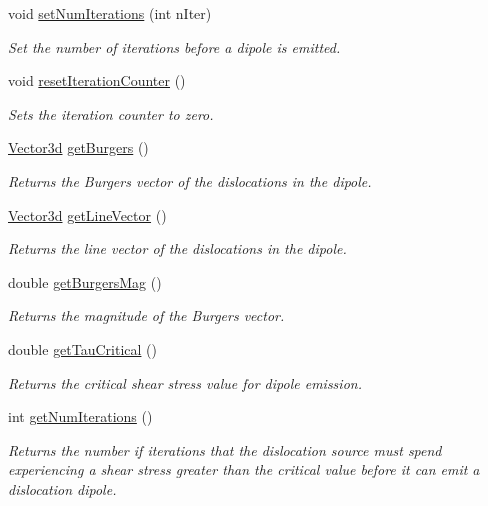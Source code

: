 \begin{DoxyCompactItemize}
void \hyperlink{classDislocationSource_a3042d73ee7ee346d825ab810dc5a6e83}{set\-Num\-Iterations} (int n\-Iter)
\begin{DoxyCompactList}\small\item\em Set the number of iterations before a dipole is emitted. \end{DoxyCompactList}\item 
void \hyperlink{classDislocationSource_a6dd6ad9fe448ce37152dfae4f3981ff0}{reset\-Iteration\-Counter} ()
\begin{DoxyCompactList}\small\item\em Sets the iteration counter to zero. \end{DoxyCompactList}\item 
\hyperlink{classVector3d}{Vector3d} \hyperlink{classDislocationSource_a4c07b688946410963dd41ce3bfc3a022}{get\-Burgers} ()
\begin{DoxyCompactList}\small\item\em Returns the Burgers vector of the dislocations in the dipole. \end{DoxyCompactList}\item 
\hyperlink{classVector3d}{Vector3d} \hyperlink{classDislocationSource_a896f35e3c84654958d75b1cc964c42a1}{get\-Line\-Vector} ()
\begin{DoxyCompactList}\small\item\em Returns the line vector of the dislocations in the dipole. \end{DoxyCompactList}\item 
double \hyperlink{classDislocationSource_a20360b318adfa4457786d6bbd28fd99d}{get\-Burgers\-Mag} ()
\begin{DoxyCompactList}\small\item\em Returns the magnitude of the Burgers vector. \end{DoxyCompactList}\item 
double \hyperlink{classDislocationSource_aede21b6b4e323423ec1f6cb9261cb311}{get\-Tau\-Critical} ()
\begin{DoxyCompactList}\small\item\em Returns the critical shear stress value for dipole emission. \end{DoxyCompactList}\item 
int \hyperlink{classDislocationSource_a0df8fa36aa46044808227044113f14fe}{get\-Num\-Iterations} ()
\begin{DoxyCompactList}\small\item\em Returns the number if iterations that the dislocation source must spend experiencing a shear stress greater than the critical value before it can emit a dislocation dipole. \end{DoxyCompactList}\item 

\end{DoxyCompactItemize}
